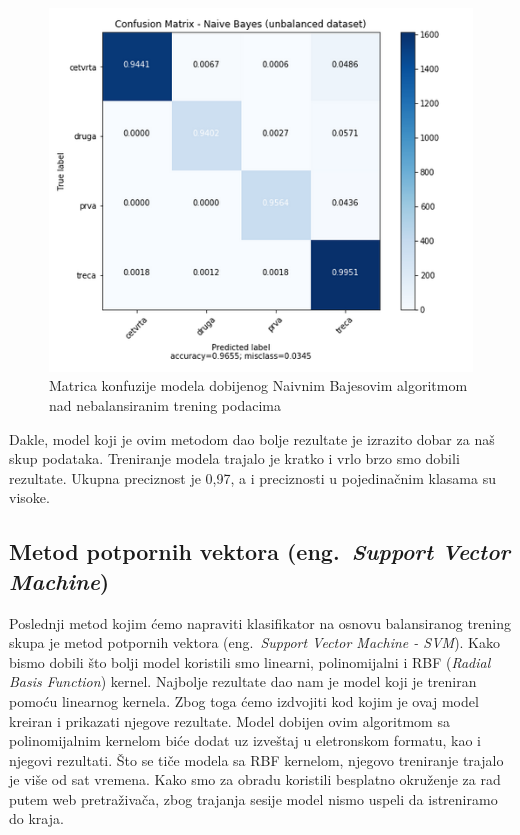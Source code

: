 \documentclass[a4paper]{article}
\begin{document}
\begin{figure}[h!]
\begin{center}
\includegraphics[scale=0.5]{bajes_nebalansirani_skup.png}
\end{center}
\caption{Matrica konfuzije modela dobijenog Naivnim Bajesovim algoritmom nad nebalansiranim trening podacima}
\label{fig:bajes2}
\end{figure}

Dakle, model koji je ovim metodom dao bolje rezultate je izrazito dobar za naš skup podataka. Treniranje modela trajalo je kratko i vrlo brzo smo dobili rezultate. Ukupna preciznost je 0,97, a i preciznosti u pojedinačnim klasama su visoke.

\subsection{Metod potpornih vektora (eng.~{\em Support Vector Machine})}
Poslednji metod kojim ćemo napraviti klasifikator na osnovu balansiranog trening skupa je metod potpornih vektora (eng.~{\em Support Vector Machine - SVM}). Kako bismo dobili što bolji model koristili smo linearni, polinomijalni i RBF ({\em Radial Basis Function}) kernel. Najbolje rezultate dao nam je model koji je treniran pomoću linearnog kernela. Zbog toga ćemo izdvojiti kod kojim je ovaj model kreiran i prikazati njegove rezultate. Model dobijen ovim algoritmom sa polinomijalnim kernelom biće dodat uz izveštaj u eletronskom formatu, kao i njegovi rezultati. Što se tiče modela sa RBF kernelom, njegovo treniranje trajalo je više od sat vremena. Kako smo za obradu koristili besplatno okruženje za rad putem web pretraživača, zbog trajanja sesije model nismo uspeli da istreniramo do kraja.
\end{document}

